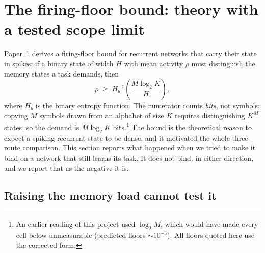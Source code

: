 
\section{The firing-floor bound: theory with a tested scope limit}
\label{sec:bound}

Paper~1 \citep{paper1} derives a firing-floor bound for recurrent networks that carry their
state in spikes: if a binary state of width $H$ with mean activity $\rho$ must distinguish
the memory states a task demands, then
%
\begin{equation}
\rho \;\ge\; H_b^{-1}\!\left(\frac{M \log_2 K}{H}\right),
\label{eq:floor}
\end{equation}
%
where $H_b$ is the binary entropy function. The numerator counts \emph{bits}, not symbols:
copying $M$ symbols drawn from an alphabet of size $K$ requires distinguishing $K^M$ states,
so the demand is $M\log_2 K$ bits.\footnote{An earlier reading of this project used
$\log_2 M$, which would have made every cell below unmeasurable (predicted floors
$\sim 10^{-3}$). All floors quoted here use the corrected form.} The bound is the
theoretical reason to expect a spiking recurrent state to be dense, and it motivated the
whole three-route comparison. This section reports what happened when we tried to make it
bind on a network that still learns its task. It does not bind, in either direction, and we
report that as the negative it is.

\subsection{Raising the memory load cannot test it}
\label{sec:bound-M}

